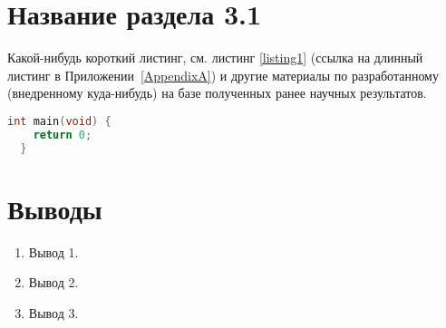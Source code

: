 
%
%
%
%

\begin{singlespace}
   \label{chapt3}
\end{singlespace}

\section{Название раздела 3.1} \label{sect3_1}

Какой-нибудь короткий листинг, см. листинг \ref{listing1} (ссылка на
длинный листинг в Приложении~\ref{AppendixA}) и другие материалы по
разработанному (внедренному куда-нибудь) на базе полученных ранее
научных результатов.

\begin{lstlisting}[language=C,label=listing1,caption=Пример короткого
  листинга на языке C (\textbf{blank.c})]
  int main(void) {
    return 0;
  }
\end{lstlisting}


\section{Выводы} \label{sect3_2}

\begin{enumerate}
\item Вывод 1.
\item Вывод 2.
\item Вывод 3.
\end{enumerate}


